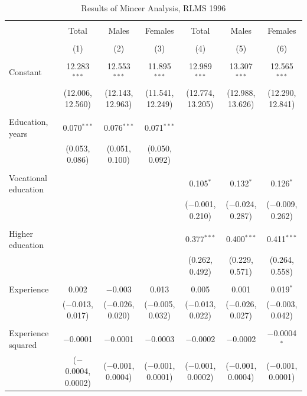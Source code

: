 \documentclass[alpha-refs]{wiley-article-01g}
\begin{document}
\begin{landscape}

\fontsize{9}{11}
\selectfont

\begin{table}[!htbp] \centering 
\renewcommand{\arraystretch}{1.0}
  \caption{Results of Mincer Analysis, RLMS 1996} 
  \label{} 
\begin{tabular}{@{\extracolsep{5pt}}lcccccc} 
\\[-1.8ex]\hline 
\hline \\[-1.8ex] 
 & Total & Males & Females & Total & Males & Females \\ 
\\[-1.8ex] & (1) & (2) & (3) & (4) & (5) & (6)\\ 
\hline \\[-1.8ex] 
 Constant & 12.283$^{***}$ & 12.553$^{***}$ & 11.895$^{***}$ & 12.989$^{***}$ & 13.307$^{***}$ & 12.565$^{***}$ \\ 
  & (12.006, 12.560) & (12.143, 12.963) & (11.541, 12.249) & (12.774, 13.205) & (12.988, 13.626) & (12.290, 12.841) \\ 
  & & & & & & \\ 
 Education, years & 0.070$^{***}$ & 0.076$^{***}$ & 0.071$^{***}$ &  &  &  \\ 
  & (0.053, 0.086) & (0.051, 0.100) & (0.050, 0.092) &  &  &  \\ 
  & & & & & & \\ 
 Vocational education &  &  &  & 0.105$^{*}$ & 0.132$^{*}$ & 0.126$^{*}$ \\ 
  &  &  &  & ($-$0.001, 0.210) & ($-$0.024, 0.287) & ($-$0.009, 0.262) \\ 
  & & & & & & \\ 
 Higher education &  &  &  & 0.377$^{***}$ & 0.400$^{***}$ & 0.411$^{***}$ \\ 
  &  &  &  & (0.262, 0.492) & (0.229, 0.571) & (0.264, 0.558) \\ 
  & & & & & & \\ 
 Experience & 0.002 & $-$0.003 & 0.013 & 0.005 & 0.001 & 0.019$^{*}$ \\ 
  & ($-$0.013, 0.017) & ($-$0.026, 0.020) & ($-$0.005, 0.032) & ($-$0.013, 0.022) & ($-$0.026, 0.027) & ($-$0.003, 0.042) \\ 
  & & & & & & \\ 
 Experience squared & $-$0.0001 & $-$0.0001 & $-$0.0003 & $-$0.0002 & $-$0.0002 & $-$0.0004$^{*}$ \\ 
  & ($-$0.0004, 0.0002) & ($-$0.001, 0.0004) & ($-$0.001, 0.0001) & ($-$0.001, 0.0002) & ($-$0.001, 0.0004) & ($-$0.001, 0.0001) \\ 

\end{tabular}
\end{table}
\end{landscape}
\end{document}
